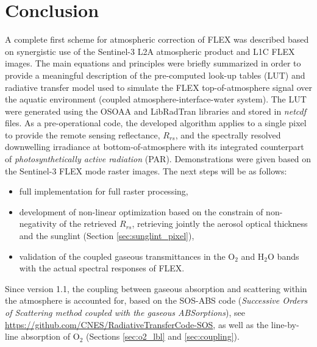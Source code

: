 \documentclass{article}
\begin{document}
\section{Conclusion}
A complete first scheme for atmospheric correction of FLEX was described based on synergistic use of the Sentinel-3 L2A atmospheric product and L1C FLEX images. The main equations and principles were briefly summarized in order to provide a meaningful description of the pre-computed look-up tables (LUT) and radiative transfer model used to simulate the FLEX top-of-atmosphere signal over the aquatic environment (coupled atmosphere-interface-water system). The LUT were generated using the OSOAA and LibRadTran libraries and stored in \textit{netcdf} files. As a pre-operational code, the developed algorithm applies to a single pixel to provide the remote sensing reflectance, $R_{rs}$, and the spectrally resolved downwelling irradiance at bottom-of-atmosphere with its integrated counterpart of \textit{photosynthetically active radiation} (PAR). Demonstrations were given based on the Sentinel-3 FLEX mode raster images. The next steps will be as follows:
\begin{itemize}
    \item full implementation for full raster processing,
    \item development of non-linear optimization based on the constrain of non-negativity of the retrieved $R_{rs}$, retrieving jointly the aerosol optical thickness and the sunglint (Section \ref{sec:sunglint_pixel}),
    \item validation of the coupled gaseous transmittances in the O$_2$ and H$_2$O bands with the actual spectral responses of FLEX.
\end{itemize}
Since version 1.1, the coupling between gaseous absorption and scattering within the atmosphere is accounted for, based on the
SOS-ABS code (\textit{Successive Orders of Scattering method coupled with the gaseous ABSorptions}), see
\url{https://github.com/CNES/RadiativeTransferCode-SOS}, as well as the line-by-line absorption of O$_2$ (Sections
\ref{sec:o2_lbl} and \ref{sec:coupling}).



\clearpage
{}


\end{document}

